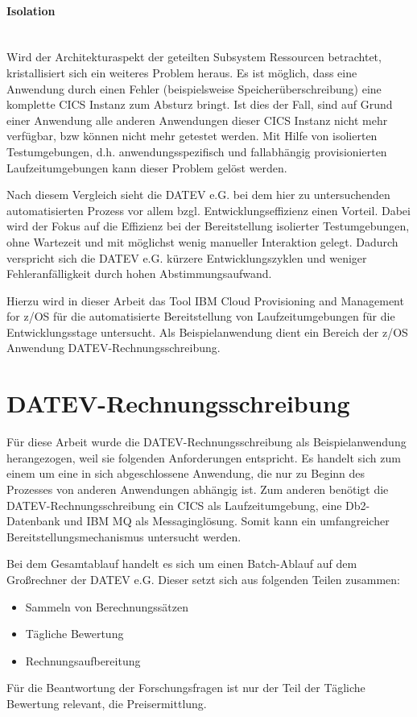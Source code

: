 \paragraph{Isolation}~\\

Wird der Architekturaspekt der geteilten Subsystem Ressourcen betrachtet, kristallisiert sich ein weiteres Problem heraus.
Es ist möglich, dass eine Anwendung durch einen Fehler (beispielsweise Speicherüberschreibung) eine komplette CICS Instanz zum Absturz bringt.
Ist dies der Fall, sind auf Grund einer Anwendung alle anderen Anwendungen dieser CICS Instanz nicht mehr verfügbar, bzw können nicht mehr getestet werden.
Mit Hilfe von isolierten Testumgebungen, d.h. anwendungsspezifisch und fallabhängig provisionierten Laufzeitumgebungen kann dieser Problem gelöst werden.

Nach diesem Vergleich sieht die DATEV e.G. bei dem hier zu untersuchenden  automatisierten Prozess vor allem bzgl. Entwicklungseffizienz einen Vorteil.
Dabei wird der Fokus auf die Effizienz bei der Bereitstellung isolierter Testumgebungen, ohne Wartezeit und mit möglichst wenig manueller Interaktion gelegt.
Dadurch verspricht sich die DATEV e.G. kürzere Entwicklungszyklen und weniger Fehleranfälligkeit durch hohen Abstimmungsaufwand.

Hierzu wird in dieser Arbeit das Tool \glqq IBM Cloud Provisioning and Management for z/OS\grqq{} für die automatisierte Bereitstellung von Laufzeitumgebungen für die Entwicklungsstage untersucht.
Als Beispielanwendung dient ein Bereich der z/OS Anwendung \glqq DATEV-Rechnungsschreibung\grqq.

\section{DATEV-Rechnungsschreibung}\label{rechBesch}
Für diese Arbeit wurde die DATEV-Rechnungsschreibung als Beispielanwendung herangezogen, weil sie folgenden Anforderungen entspricht.
Es handelt sich zum einem um eine in sich abgeschlossene Anwendung, die nur zu Beginn des Prozesses von anderen Anwendungen abhängig ist.
Zum anderen benötigt die DATEV-Rechnungsschreibung ein CICS als Laufzeitumgebung, eine Db2-Datenbank und IBM MQ als Messaginglösung.
Somit kann ein umfangreicher Bereitstellungsmechanismus untersucht werden.

Bei dem Gesamtablauf handelt es sich um einen Batch-Ablauf auf dem Großrechner der DATEV e.G.
Dieser setzt sich aus folgenden Teilen zusammen:
\begin{itemize}
\item Sammeln von Berechnungssätzen
\item Tägliche Bewertung
\item Rechnungsaufbereitung
\end{itemize}
Für die Beantwortung der Forschungsfragen ist nur der Teil der \glqq Tägliche Bewertung\grqq{} relevant, die Preisermittlung.


